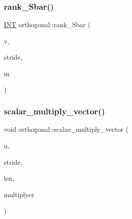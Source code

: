 \subsubsection{\texorpdfstring{rank\+\_\+\+Sbar()}{rank\_Sbar()}}
{\footnotesize\ttfamily \mbox{\hyperlink{galois_8h_a09fddde158a3a20bd2dcadb609de11dc}{I\+NT}} orthogonal\+::rank\+\_\+\+Sbar (\begin{DoxyParamCaption}\item[{\mbox{\hyperlink{galois_8h_a09fddde158a3a20bd2dcadb609de11dc}{I\+NT}} $\ast$}]{v,  }\item[{\mbox{\hyperlink{galois_8h_a09fddde158a3a20bd2dcadb609de11dc}{I\+NT}}}]{stride,  }\item[{\mbox{\hyperlink{galois_8h_a09fddde158a3a20bd2dcadb609de11dc}{I\+NT}}}]{m }\end{DoxyParamCaption})}

\mbox{\label{classorthogonal_aa09d1376cd2f6bd9a3dbc05d2e300345}} 
\subsubsection{\texorpdfstring{scalar\+\_\+multiply\+\_\+vector()}{scalar\_multiply\_vector()}}
{\footnotesize\ttfamily void orthogonal\+::scalar\+\_\+multiply\+\_\+vector (\begin{DoxyParamCaption}\item[{\mbox{\hyperlink{galois_8h_a09fddde158a3a20bd2dcadb609de11dc}{I\+NT}} $\ast$}]{u,  }\item[{\mbox{\hyperlink{galois_8h_a09fddde158a3a20bd2dcadb609de11dc}{I\+NT}}}]{stride,  }\item[{\mbox{\hyperlink{galois_8h_a09fddde158a3a20bd2dcadb609de11dc}{I\+NT}}}]{len,  }\item[{\mbox{\hyperlink{galois_8h_a09fddde158a3a20bd2dcadb609de11dc}{I\+NT}}}]{multiplyer }\end{DoxyParamCaption})}

\mbox{\label{classorthogonal_a69dd8beb5401fd5f326ca6687296bc2f}} 
